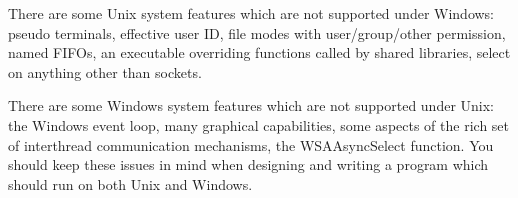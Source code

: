 There are some Unix system features which are not supported under Windows: pseudo terminals, effective user ID, file modes with user/group/other permission, named FIFOs, an executable overriding functions called by shared libraries, select on anything other than sockets.

There are some Windows system features which are not supported under Unix: the Windows event loop, many graphical capabilities, some aspects of the rich set of interthread communication mechanisms, the WSAAsyncSelect function. You should keep these issues in mind when designing and writing a program which should run on both Unix and Windows. 



